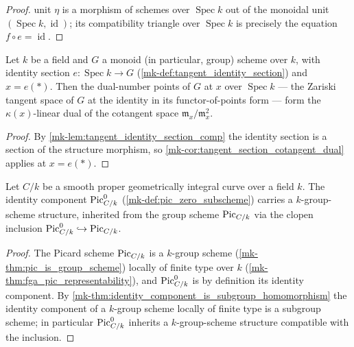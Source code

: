 \begin{proof}
  \leanokThe unit \(\eta\) is a morphism of schemes over
  \(\operatorname{Spec} k\) out of the monoidal unit
  \((\operatorname{Spec} k, \operatorname{id})\); its compatibility
  triangle over \(\operatorname{Spec} k\) is precisely the equation
  \(f \circ e = \operatorname{id}\).
\end{proof}

\begin{theorem}\label{mk-thm:tangent_identity_cotangent_dual}
  \leanok

  Let \(k\) be a field and \(G\) a monoid (in particular, group)
  scheme over \(k\), with identity section
  \(e : \operatorname{Spec} k \to G\)
  (\ref{mk-def:tangent_identity_section}) and \(x = e(*)\). Then the
  dual-number points of \(G\) at \(x\) over \(\operatorname{Spec} k\)
  — the Zariski tangent space of \(G\) at the identity in its
  functor-of-points form — form the \(\kappa(x)\)-linear dual of the
  cotangent space \(\mathfrak m_x/\mathfrak m_x^2\).
\end{theorem}

\begin{proof}
  \leanok{}
  By \ref{mk-lem:tangent_identity_section_comp} the identity section is
  a section of the structure morphism, so
  \ref{mk-cor:tangent_section_cotangent_dual} applies at \(x = e(*)\).
\end{proof}

\begin{theorem}\label{mk-thm:pic0_group_structure}
  \leanok

  Let \(C/k\) be a smooth proper geometrically integral curve over a
  field \(k\). The identity component \(\operatorname{Pic}^0_{C/k}\)
  (\ref{mk-def:pic_zero_subscheme}) carries a \(k\)-group-scheme
  structure, inherited from the group scheme \(\operatorname{Pic}_{C/k}\) via the
  clopen inclusion \(\operatorname{Pic}^0_{C/k} \hookrightarrow \operatorname{Pic}_{C/k}\).
\end{theorem}

\begin{proof}
  \leanok{}
  The Picard scheme \(\operatorname{Pic}_{C/k}\) is a \(k\)-group scheme
  (\ref{mk-thm:pic_is_group_scheme}) locally of finite type over \(k\)
  (\ref{mk-thm:fga_pic_representability}), and \(\operatorname{Pic}^0_{C/k}\) is by
  definition its identity component. By
  \ref{mk-thm:identity_component_is_subgroup_homomorphism} the identity
  component of a \(k\)-group scheme locally of finite type is a
  subgroup scheme; in particular \(\operatorname{Pic}^0_{C/k}\) inherits a
  \(k\)-group-scheme structure compatible with the inclusion.
\end{proof}

